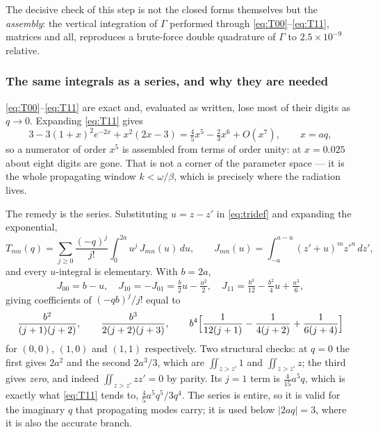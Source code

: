 \documentclass[11pt,a4paper]{article}
\begin{document}
The decisive check of this step is not the closed forms themselves but the
\emph{assembly}: the vertical integration of $\Gamma$ performed through
\eqref{eq:T00}--\eqref{eq:T11}, matrices and all, reproduces a brute-force
double quadrature of $\Gamma$ to $2.5\times10^{-9}$ relative.

\subsubsection{The same integrals as a series, and why they are
needed}\label{sec:triseries}

\eqref{eq:T00}--\eqref{eq:T11} are exact and, evaluated as written, lose most of
their digits as $q\to0$.  Expanding \eqref{eq:T11} gives
\begin{equation}
  3 - 3(1+x)^{2}e^{-2x} + x^{2}(2x-3) = \tfrac{4}{5}x^{5} - \tfrac{2}{3}x^{6} +
  O(x^{7}), \qquad x = aq,
\end{equation}
so a numerator of order $x^{5}$ is assembled from terms of order unity: at
$x = 0.025$ about eight digits are gone.  That is not a corner of the parameter
space --- it is the whole propagating window $k < \omega/\beta$, which is
precisely where the radiation lives.

The remedy is the series.  Substituting $u = z-z'$ in \eqref{eq:tridef} and
expanding the exponential,
\begin{equation}\label{eq:triseries}
  T_{mn}(q) = \sum_{j\ge0} \frac{(-q)^{j}}{j!}
              \int_{0}^{2a}\!\! u^{j}\,J_{mn}(u)\,du ,
  \qquad
  J_{mn}(u) = \int_{-a}^{a-u} (z'+u)^{m} z'^{n}\,dz' ,
\end{equation}
and every $u$-integral is elementary.  With $b = 2a$,
\begin{equation}
  J_{00} = b - u, \quad
  J_{10} = -J_{01} = \tfrac{b}{2}u - \tfrac{u^{2}}{2}, \quad
  J_{11} = \tfrac{b^{3}}{12} - \tfrac{b^{2}}{4}u + \tfrac{u^{3}}{6},
\end{equation}
giving coefficients of $(-qb)^{j}/j!$ equal to
\begin{equation}\label{eq:tricoef}
  \frac{b^{2}}{(j+1)(j+2)}, \qquad
  \frac{b^{3}}{2(j+2)(j+3)}, \qquad
  b^{4}\Bigl[\frac{1}{12(j+1)} - \frac{1}{4(j+2)} + \frac{1}{6(j+4)}\Bigr]
\end{equation}
for $(0,0)$, $(1,0)$ and $(1,1)$ respectively.  Two structural checks: at $q=0$
the first gives $2a^{2}$ and the second $2a^{3}/3$, which are
$\iint_{z>z'}1$ and $\iint_{z>z'}z$; the third gives \emph{zero}, and indeed
$\iint_{z>z'} zz' = 0$ by parity.  Its $j=1$ term is $\tfrac{4}{15}a^{5}q$, which
is exactly what \eqref{eq:T11} tends to, $\tfrac{4}{5}a^{5}q^{5}/3q^{4}$.  The
series is entire, so it is valid for the imaginary $q$ that propagating modes
carry; it is used below $|2aq| = 3$, where it is also the accurate branch.
\end{document}
